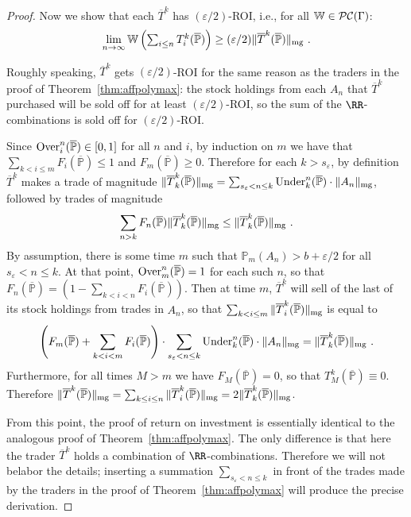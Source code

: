 \documentclass[authordate,onecolumn,noenvironments]{miri-tech-article}
\numberwithin{equation}{subsection}
\newcommand{\seq}[1]{{\overline{#1}}}
\newcommand{\aff}{A}
\newcommand{\trade}{T}%
\newcommand{\Trader}{\seq{\trade}} %
\newcommand{\magnit}[1]{{\|#1\|_{\rm mg}}} %
\newcommand{\BelState}{\mathbb{P}}
\newcommand{\pt}{\BelState}
\newcommand{\MP}{\seq{\pt}}
\newcommand{\ftn}{(\MP)} %
\newcommand{\cworlds}{\mathcal{P\-C}} %
\newcommand{\World}{\mathbb{W}}
\newcommand{\Theory}{\Gamma}
\newcommand{\underpriced}{{\rm Under}}
\newcommand{\overpriced}{{\rm Over}}
\newcommand{\localportfoliovalue}{b}
\begin{document}
\begin{proof}
Now we show that each $\Trader^k$ 
has $(\varepsilon/2)$-ROI, i.e., for all $\World \in \cworlds(\Theory)$: 
%
 \[ \lim_{n \to\infty}\World\left( {\textstyle \sum_{i \leq n} \trade^k_i(\MP)}\right)
\geq
(\varepsilon/2)
\magnit{\Trader^k \ftn}\ .\]

Roughly speaking, $\Trader^k$ gets 
$(\varepsilon/2)$-ROI for the same reason as the traders in the proof of Theorem~\ref{thm:affpolymax}: the stock holdings from 
each $\aff_{n}$ that $\Trader^k$ purchased will be sold
off for at least $(\varepsilon/2)$-ROI, so the sum of the $\RR$-combinations is sold off for $(\varepsilon/2)$-ROI\@. 

Since $\overpriced_i^n \ftn \in [0,1]$ for all $n$ and $i$, 
by induction on $m$ we have that $\sum_{k<i\leq m} F_i\ftn  \leq 1$ and $F_m\ftn  \ge 0$. 
Therefore  for each $k> s_\varepsilon$,  by definition $\Trader^k$ makes a trade of magnitude $\magnit{\Trader^k_k \ftn } =  
\sum_{s_\varepsilon < n\le k}\underpriced_k^n\ftn  \cdot \magnit{\aff_n} $, 
followed by trades of magnitude 
%
\[ \sum_{n>k} F_n\ftn  \magnit{\Trader^k_k \ftn } \leq   \magnit{\Trader^k_k \ftn }\ .  \]
%
By assumption, there is some time $m$  such that 
$\pt_{m}(\aff_n)  > \localportfoliovalue + \varepsilon/2$ for all $s_\varepsilon < n \le k$. At that point, $\overpriced_m^n \ftn = 1$ for each such $n$, so that $F_n \ftn = 
\left(1 - \sum_{k<i<n}F_i \ftn \right) $. Then at time $m$, $\Trader^k$ will sell of the last of its stock holdings from trades in $\aff_{n}$, so that $\sum_{k< i \leq m} \magnit{\Trader^k_i \ftn}$ is equal to
%
\[  \left(F_m \ftn +  \sum_{k<i <m} F_i \ftn\right) \cdot 
 \sum_{s_\varepsilon < n\le k}\underpriced_k^n \ftn \cdot \magnit{\aff_n}  = \magnit{ \Trader^k_k\ftn} \ . \]
%
Furthermore, for all times $M>m$ we have $F_M\ftn = 0$,  so that $\trade^k_M\ftn \equiv 0$. Therefore $ \magnit{\Trader^k \ftn}= \sum_{k\leq
i \leq n} \magnit{\Trader^k_i\ftn}= 2\magnit{\Trader^k_k\ftn}$. 

From this point, the proof of return on investment is essentially identical to the analogous proof of Theorem~\ref{thm:affpolymax}. The only difference is that here the
trader $\Trader^k$ holds a combination of $\RR$-combinations. Therefore we will not belabor the details; inserting a summation  $\sum_{s_\varepsilon < n\le k}$ in
front of the trades made by the traders in the proof of Theorem~\ref{thm:affpolymax} will produce the precise derivation. 


\end{proof}
\end{document}
